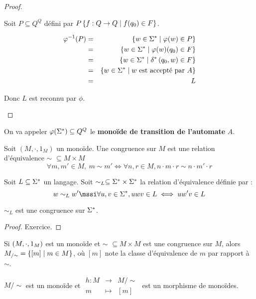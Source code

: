 \begin{proof}
\begin{itemize}
\begin{itemize}
			            Soit $P \subseteq Q^Q$ défini par $P \left\{f : Q \to Q \mid f(q_0)\in F\right\}$.

			            \begin{eqnarray*}
				            \varphi^{-1} (P) &=& \left\{w \in \Sigma^{*} \mid \varphi (w) \in P\right\} \\
				            &=& \left\{w \in \Sigma^{*} \mid \varphi (w) (q_0)\in F\right\} \\
				            &=& \left\{w \in \Sigma^{*} \mid \delta^{*} \left(q_0,w\right) \in F\right\}\\
				            &=& \left\{w \in \Sigma^{*} \mid w \text { est accepté par } A\right\}\\
				            &=& L
			            \end{eqnarray*}
		      \end{itemize}

		      Donc $L$ est reconnu par $\phi$.
	\end{itemize}
\end{proof}


\begin{definition}
	On va appeler $\varphi (\Sigma^{*})\subseteq Q^Q$ le \textbf{monoïde de transition de l'automate} $A$.
\end{definition}


\begin{definition}[Congruence]
	Soit $(M, \cdot, 1_M)$ un monoïde. Une congruence sur $M$ est une relation d'équivalence $\sim$ $\subseteq M \times M$ \tlq
	$$\forall m,m'\in M, \ m \sim m' \iff \forall n,r \in M, n\cdot m \cdot r \sim n \cdot m' \cdot r$$
\end{definition}



\begin{definition}
	Soit $L \subseteq \Sigma^{*}$ un langage. Soit $\sim_L \subseteq \Sigma^{*} \times \Sigma^{*}$ la relation d'équivalence définie par :
	$$ w \sim_L w' \mssi \forall u,v \in \mots, uwv \in L \iff u w' v \in L$$
\end{definition}

\begin{prop}
	$\sim_L$ est une congruence sur $\Sigma^{*}$.
\end{prop}

\begin{proof}
	Exercice.
\end{proof}


\begin{prop}
	Si $(M, \cdot, 1_M)$ est un monoïde et $\sim$ $\subseteq M \times M$ est une congruence sur $M$, alors $M_{/\sim} = \left\{[m] \mid m \in M\right\}$, où $[m]$ note la classe d'équivalence de $m$ par rapport à $\sim$.

	$M/\sim$ est un monoïde et $ \begin{array}{rcl}
			h : M & \to     & M/\sim \\
			m     & \mapsto & [m]
		\end{array} $ est un morphisme de monoïdes.
\end{prop}

